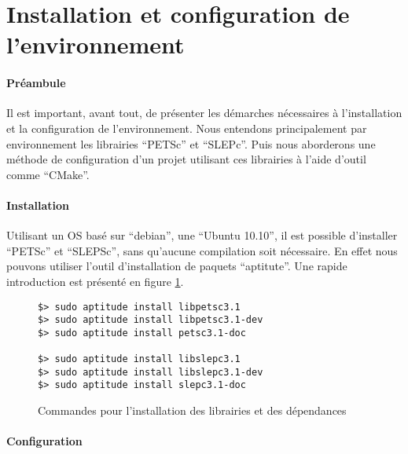 %

\section{Installation et configuration de l'environnement}

\paragraph{Préambule}

Il est important, avant tout, de présenter les démarches nécessaires à l'installation et la configuration de l'environnement. Nous entendons principalement par environnement les librairies ``PETSc'' et ``SLEPc''. Puis nous aborderons une méthode de configuration d'un projet utilisant ces librairies à l'aide d'outil comme ``CMake''.

\paragraph{Installation}

Utilisant un OS basé sur ``debian'', une ``Ubuntu 10.10'', il est possible d'installer ``PETSc'' et ``SLEPSc'', sans qu'aucune compilation soit nécessaire. En effet nous pouvons utiliser l'outil d'installation de paquets ``aptitute''. Une rapide introduction est présenté en figure \ref{fig:installation}.

\begin{figure}[here]
\begin{verbatim}
$> sudo aptitude install libpetsc3.1
$> sudo aptitude install libpetsc3.1-dev
$> sudo aptitude install petsc3.1-doc

$> sudo aptitude install libslepc3.1
$> sudo aptitude install libslepc3.1-dev
$> sudo aptitude install slepc3.1-doc
\end{verbatim}
  \caption{Commandes pour l'installation des librairies et des dépendances}
  \label{fig:installation}
\end{figure}

\paragraph{Configuration}

